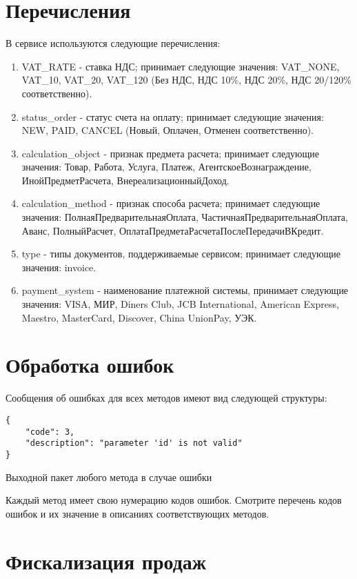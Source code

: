 \documentclass[11pt, a4paper]{article}
\begin{document}
\section{Перечисления}

В сервисе используются следующие перечисления:
\begin{enumerate}
	\item VAT\_RATE - ставка НДС; принимает следующие значения: VAT\_NONE, VAT\_10, VAT\_20, VAT\_120 (Без НДС, НДС 10\%, НДС 20\%, НДС 20/120\% соответственно).
	\item status\_order - статус счета на оплату; принимает следующие значения: NEW, PAID, CANCEL (Новый, Оплачен, Отменен соответственно).
	\item calculation\_object - признак предмета расчета; принимает следующие значения: Товар, Работа, Услуга, Платеж, АгентскоеВознаграждение, ИнойПредметРасчета, ВнереализационныйДоход.
	\item calculation\_method - признак способа расчета; принимает следующие значения: ПолнаяПредварительнаяОплата, ЧастичнаяПредварительнаяОплата, Аванс, ПолныйРасчет, ОплатаПредметаРасчетаПослеПередачиВКредит.
	\item type - типы документов, поддерживаемые сервисом; принимает следующие значения: invoice.
	\item payment\_system - наименование платежной системы, принимает следующие значения: VISA, МИР, Diners Club, JCB International, American Express, Maestro, MasterCard, Discover, China UnionPay, УЭК.
\end{enumerate}

\section{Обработка ошибок}

Сообщения об ошибках для всех методов имеют вид следующей структуры:

\begin{listing}[H]
	\begin{verbatim}
{
	"code": 3,
	"description": "parameter 'id' is not valid"
}
\end{verbatim}
\caption{Выходной пакет любого метода в случае ошибки} 
\end{listing}

Каждый метод имеет свою нумерацию кодов ошибок. Смотрите перечень кодов ошибок и их значение в описаниях соответствующих методов.

\section{Фискализация продаж}
\end{document}
